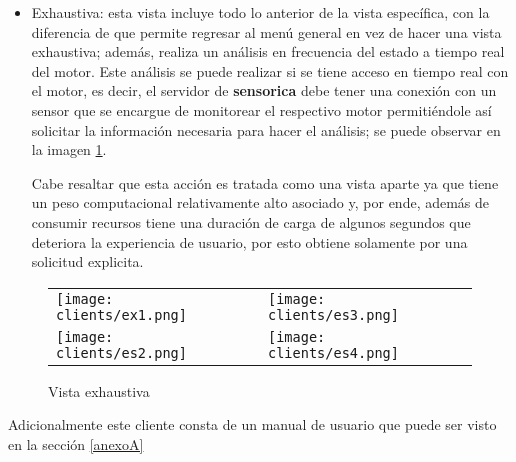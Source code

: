 \begin{itemize}
        \vspace{-1.5cm}
    \item Exhaustiva: esta vista incluye todo lo anterior de la vista específica,
        con la diferencia de que permite regresar al menú general en vez de hacer
        una vista exhaustiva; además, realiza un análisis en frecuencia
        del estado a tiempo real del motor. Este análisis se puede realizar si
        se tiene acceso en tiempo real con el motor, es decir,
        el servidor de \textbf{sensorica} debe tener una conexión con un sensor que se
        encargue de monitorear el respectivo motor permitiéndole así solicitar
        la información necesaria para hacer el análisis;
        se puede observar en la imagen \ref{img:VistaExhaustiva}.

        Cabe resaltar que esta acción es tratada como una vista aparte ya que
        tiene un peso computacional relativamente alto asociado y, por ende,
        además de consumir recursos tiene una duración de carga de algunos
        segundos que deteriora la experiencia de usuario, por esto
        obtiene solamente por una solicitud explicita.
\end{itemize}

\begin{center}
    \begin{figure}[ht]
		\centering
        \caption{Vista exhaustiva}
            \begin{tabular}{m{6cm}m{6cm}}
                \texttt{[image: clients/ex1.png]}&
        \texttt{[image: clients/es3.png]}\\
                \texttt{[image: clients/es2.png]}&
        \texttt{[image: clients/es4.png]}\\
            \end{tabular}
        \label{img:VistaExhaustiva}
	\end{figure}
\end{center}

Adicionalmente este cliente consta de un manual de usuario que puede ser visto
en la sección \ref{anexoA}
